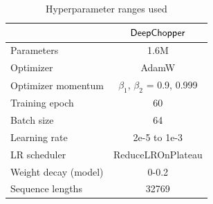 \documentclass[pdflatex, sn-mathphys-num, lineno]{sn-jnl}%
\theoremstyle{thmstyleone}%
\theoremstyle{thmstyletwo}%
\theoremstyle{thmstylethree}%
\begin{document}
\begin{table}
	\centering
	\caption{Hyperparameter ranges used}\label{tab:hyperparameter}
	\begin{tabular}{lc}
		\toprule
		                     & {$\sf DeepChopper$}               \\
		\midrule
		Parameters           & 1.6M                              \\
		Optimizer            & AdamW                             \\
		Optimizer momentum   & $\beta_1$, $\beta_2$ = 0.9, 0.999 \\
		Training epoch       & 60                                \\
		Batch size           & 64                                \\
		Learning rate        & 2e-5 to 1e-3                      \\
		LR scheduler         & ReduceLROnPlateau                 \\
		Weight decay (model) & 0-0.2                             \\
		Sequence lengths     & 32769                             \\
		\midrule
	\end{tabular}
\end{table}


%
\end{document}
